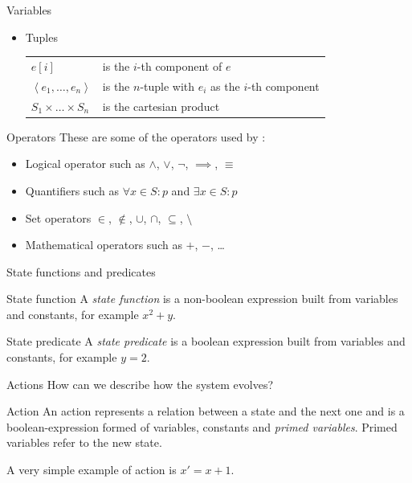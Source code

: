 \begin{frame}{Variables}
\begin{itemize}
{\begin{center}
            \end{center}
        }
        \item<5-> Tuples
         {
            \begin{center}
                \begin{tabularx}{0.92\textwidth}{lX}
                    $e \left[ i \right]$ & is the $i$-th component of $e$\\
                    $\left< e_1, \dots, e_n \right>$ & is the $n$-tuple with $e_i$ as the $i$-th component\\
                    $S_1 \times \dots \times S_n$ & is the cartesian product\\
                \end{tabularx}
            \end{center}
        }
    \end{itemize}
\end{frame}

\begin{frame}{Operators}
    These are some of the operators used by \tlap:
    \begin{itemize}
        \item Logical operator such as $\land$, $\lor$, $\neg$, $\implies$, $\equiv$
        \item Quantifiers such as $\forall x \in S : p$ and $\exists x \in S : p$
        \item Set operators $\in$, $\notin$, $\cup$, $\cap$, $\subseteq$, $ \setminus $
        \item Mathematical operators such as $+$, $-$, \dots
    \end{itemize}

\end{frame}

\begin{frame}{State functions and predicates}
    \begin{block}{State function}
    A \emph{state function} is a non-boolean expression built from variables and constants, for example $x^2 + y$.
    \end{block}

    \begin{block}{State predicate}
        A \emph{state predicate} is a boolean expression built from variables and constants, for example $y = 2$.
    \end{block}
\end{frame}

\begin{frame}{Actions}
    How can we describe how the system evolves?
    \pause
    \begin{block}{Action}
        An action represents a relation between a state and the next one and is a boolean-expression formed of variables, constants and \emph{primed variables}. Primed variables refer to the new state.
    \end{block}

    A very simple example of action is $x' = x + 1$.
\end{frame}

